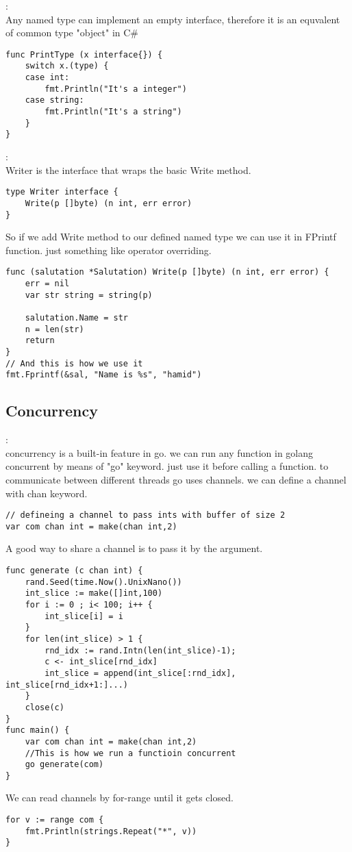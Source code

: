 \begin{note}:\\
Any named type can implement an empty interface, therefore it is an equvalent of common type "object" in C\#
\begin{lstlisting}[language=Golang]
func PrintType (x interface{}) {
	switch x.(type) {
	case int:
		fmt.Println("It's a integer")
	case string:
		fmt.Println("It's a string")
	}	
}
\end{lstlisting}
\end{note}
\begin{note}:\\
	Writer is the interface that wraps the basic Write method. 
\begin{lstlisting}[language=Golang]
type Writer interface {
	Write(p []byte) (n int, err error)
}
\end{lstlisting}
So if we add Write method to our defined named type we can use it in FPrintf function. just something like operator overriding.
\begin{lstlisting}[language=Golang]
func (salutation *Salutation) Write(p []byte) (n int, err error) {
	err = nil
	var str string = string(p)
	
	salutation.Name = str
	n = len(str)
	return
}
// And this is how we use it
fmt.Fprintf(&sal, "Name is %s", "hamid")
\end{lstlisting}
\end{note}
\subsection{Concurrency}
\begin{note}[Concurrency]:\\
concurrency is a built-in feature in go. we can run any function in golang concurrent by means of "go" keyword. just use it before calling a function. to communicate between different threads go uses channels. we can define a channel with chan keyword.
\begin{lstlisting}[language=Golang]
// defineing a channel to pass ints with buffer of size 2
var com chan int = make(chan int,2)
\end{lstlisting}
A good way to share a channel is to pass it by the argument.
\begin{lstlisting}[language=Golang]
func generate (c chan int) {
	rand.Seed(time.Now().UnixNano())
	int_slice := make([]int,100)
	for i := 0 ; i< 100; i++ {
		int_slice[i] = i
	}
	for len(int_slice) > 1 {
		rnd_idx := rand.Intn(len(int_slice)-1);
		c <- int_slice[rnd_idx]
		int_slice = append(int_slice[:rnd_idx], int_slice[rnd_idx+1:]...)
	}
	close(c)
}
func main() {
	var com chan int = make(chan int,2)
	//This is how we run a functioin concurrent
	go generate(com)
}
\end{lstlisting}
We can read channels by for-range until it gets closed.
\begin{lstlisting}[language=Golang]
for v := range com {
	fmt.Println(strings.Repeat("*", v))
}
\end{lstlisting}
\end{note}
